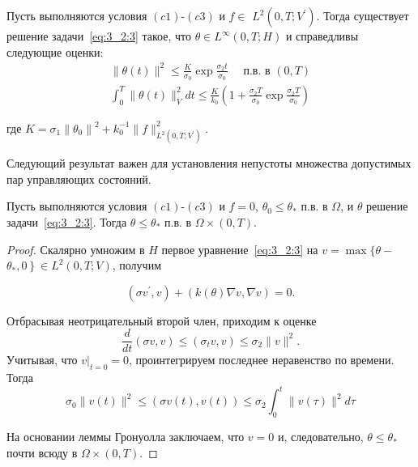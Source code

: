 \begin{lemma}
    \label{lm:3_2:1}
    Пусть выполняются условия $(c1)$-$(c3)$ и
    $f \in$ $L^{2}\left(0, T ; V^{\prime}\right)$.
    Тогда существует решение задачи~\eqref{eq:3_2:3} такое, что
    $\theta \in L^{\infty}(0, T ; H)$ и справедливы следующие оценки:
    \[
        \begin{gathered}
            \|\theta(t)\|^{2} \leq \frac{K}{\sigma_{0}} \exp \frac{\sigma_{2} t}{\sigma_{0}}
            \quad \text { п.в. в }(0, T) \\
            \int_{0}^{T}\|\theta(t)\|_{V}^{2} d t \leq
            \frac{K}{k_{0}}\left(1+\frac{\sigma_{2} T}{\sigma_{0}} \exp
            \frac{\sigma_{2} T}{\sigma_{0}}\right)
        \end{gathered}
    \]

    где $K=\sigma_{1}\left\|\theta_{0}\right\|^{2}
    + k_{0}^{-1}\|f\|_{L^{2}\left(0, T; V^{\prime}\right)}^{2}$.
\end{lemma}


Следующий результат важен для установления непустоты
множества допустимых пар управляющих состояний.

\begin{lemma}
    \label{lm:3_2:2}
    Пусть выполняются условия $(c1)$-$(c3)$ и
    $f=0$, $\theta_{0} \leq \theta_{*}$ п.в. в $\Omega$,
    и $\theta$ решение задачи~\eqref{eq:3_2:3}.
    Тогда $\theta \leq \theta_{*}$ п.в. в $\Omega \times(0, T)$.
\end{lemma}

\begin{proof}
    Скалярно умножим в $H$ первое уравнение~\eqref{eq:3_2:3} на
    $v=\max \{\theta-$ $\left.\theta_{*}, 0\right\} \in L^{2}(0, T ; V)$, получим

    \[ \left(\sigma v^{\prime}, v\right)+(k(\theta) \nabla v, \nabla v)=0. \]

    Отбрасывая неотрицательный второй член, приходим к оценке
    \[ \frac{d}{d t}(\sigma v, v) \leq\left(\sigma_{t} v, v\right) \leq \sigma_{2}\|v\|^{2}. \]
    Учитывая, что $\left.v\right|_{t=0}=0$, проинтегрируем
    последнее неравенство по времени.
    Тогда
    \[
        \sigma_{0}\|v(t)\|^{2} \leq(\sigma v(t), v(t))
        \leq \sigma_{2} \int_{0}^{t}\|v(\tau)\|^{2} d \tau
    \]

    На основании леммы Гронуолла заключаем,
    что $v=0$ и, следовательно, $\theta \leq \theta_{*}$ почти всюду в $\Omega\times(0,T)$.
\end{proof}

